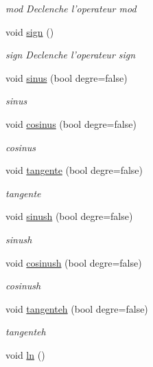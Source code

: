 \begin{DoxyCompactItemize}
\begin{DoxyCompactList}\small\item\em mod Declenche l'operateur mod \end{DoxyCompactList}\item 
\hypertarget{class_pile_ad6ce16606725f1b2fa1028073afc3b75}{void \hyperlink{class_pile_ad6ce16606725f1b2fa1028073afc3b75}{sign} ()}\label{class_pile_ad6ce16606725f1b2fa1028073afc3b75}

\begin{DoxyCompactList}\small\item\em sign Declenche l'operateur sign \end{DoxyCompactList}\item 
void \hyperlink{class_pile_a6d5405b44a45926264b48bd2df764798}{sinus} (bool degre=false)
\begin{DoxyCompactList}\small\item\em sinus \end{DoxyCompactList}\item 
void \hyperlink{class_pile_a7962c91ddf8c1a453909150fb91608db}{cosinus} (bool degre=false)
\begin{DoxyCompactList}\small\item\em cosinus \end{DoxyCompactList}\item 
void \hyperlink{class_pile_a45db8594e7934b5c9d749a9232afde4e}{tangente} (bool degre=false)
\begin{DoxyCompactList}\small\item\em tangente \end{DoxyCompactList}\item 
void \hyperlink{class_pile_a4d12d390bd97a2432f41013ffc0dcc33}{sinush} (bool degre=false)
\begin{DoxyCompactList}\small\item\em sinush \end{DoxyCompactList}\item 
void \hyperlink{class_pile_a44d3b913edb048c8d53d8f1f9549bfd3}{cosinush} (bool degre=false)
\begin{DoxyCompactList}\small\item\em cosinush \end{DoxyCompactList}\item 
void \hyperlink{class_pile_a60cc5f271bbb70323af2aa0a40d40a3f}{tangenteh} (bool degre=false)
\begin{DoxyCompactList}\small\item\em tangenteh \end{DoxyCompactList}\item 
\hypertarget{class_pile_ab22aed5e5178d32a3e47d8f4c599c9c4}{void \hyperlink{class_pile_ab22aed5e5178d32a3e47d8f4c599c9c4}{ln} ()}\label{class_pile_ab22aed5e5178d32a3e47d8f4c599c9c4}


\end{DoxyCompactItemize}
